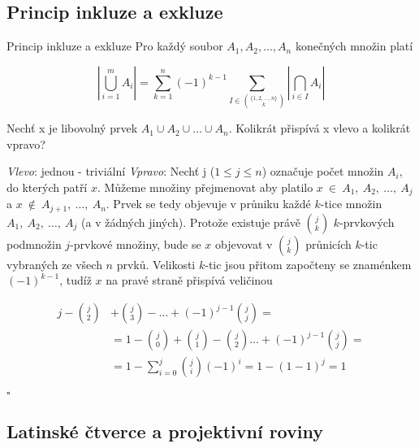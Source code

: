 \subsection{Princip inkluze a exkluze}

\begin{vetaN}{Princip inkluze a exkluze}
Pro každý soubor $A_1, A_2, \dots, A_n$ konečných množin platí

$$
\left| \bigcup_{i=1}^{m}A_i \right| = \sum_{k=1}^{n} (-1)^{k-1} {\sum_{I \in \binom{\{1,2,\dots,n\}}{k}} {\left| \bigcap_{i \in I} A_i \right|} }
$$
\end{vetaN}

\begin{dukaz}
Nechť x je libovolný prvek $A_1 \cup A_2 \cup \dots \cup A_n$. Kolikrát přispívá x vlevo a kolikrát vpravo?

\emph{Vlevo}: jednou - triviální
\emph{Vpravo}: Nechť j ($1 \le j \le n$) označuje počet množin $A_i$, do kterých patří $x$. Můžeme množiny přejmenovat aby platilo $x~\in~A_1,~A_2,~\dots,~A_j$ a $x~\notin~A_{j+1},~\dots,~A_n$. Prvek se tedy objevuje v průniku každé $k$-tice množin $A_1,~A_2,~\dots,~A_j$ (a v žádných jiných). Protože existuje právě $\binom{j}{k}$ $k$-prvkových podmnožin $j$-prvkové množiny, bude se $x$ objevovat v $\binom{j}{k}$ průnicích $k$-tic vybraných ze všech $n$ prvků. Velikosti $k$-tic jsou přitom započteny se znaménkem $(-1)^{k-1}$, tudíž $x$ na pravé straně přispívá veličinou

\begin{align*}
j - \binom{j}{2} & + \binom{j}{3} - \dots + (-1)^{j-1}\binom{j}{j} =\\
& = 1 - \binom{j}{0} + \binom{j}{1} - \binom{j}{2} \dots + (-1)^{j-1}\binom{j}{j} =\\
& = 1 - \sum_{i=0}^{j} \binom{j}{i} (-1)^{i}  = 1 - (1-1)^{j} = 1
\end{align*}
\begin{flushright}
$\square$
\end{flushright}
\end{dukaz}


\subsection{Latinské čtverce a projektivní roviny}


